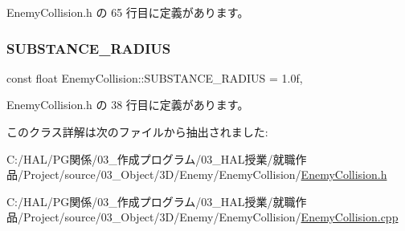  Enemy\+Collision.\+h の 65 行目に定義があります。

\mbox{\label{class_enemy_collision_ab794511516a743fdd9d8f7b00ab6a967}} 
\subsubsection{\texorpdfstring{S\+U\+B\+S\+T\+A\+N\+C\+E\+\_\+\+R\+A\+D\+I\+US}{SUBSTANCE\_RADIUS}}
{\footnotesize\ttfamily const float Enemy\+Collision\+::\+S\+U\+B\+S\+T\+A\+N\+C\+E\+\_\+\+R\+A\+D\+I\+US = 1.\+0f\hspace{0.3cm}{\ttfamily [static]}, {\ttfamily [private]}}



 Enemy\+Collision.\+h の 38 行目に定義があります。



このクラス詳解は次のファイルから抽出されました\+:\begin{DoxyCompactItemize}
\item 
C\+:/\+H\+A\+L/\+P\+G関係/03\+\_\+作成プログラム/03\+\_\+\+H\+A\+L授業/就職作品/\+Project/source/03\+\_\+\+Object/3\+D/\+Enemy/\+Enemy\+Collision/\mbox{\hyperlink{_enemy_collision_8h}{Enemy\+Collision.\+h}}\item 
C\+:/\+H\+A\+L/\+P\+G関係/03\+\_\+作成プログラム/03\+\_\+\+H\+A\+L授業/就職作品/\+Project/source/03\+\_\+\+Object/3\+D/\+Enemy/\+Enemy\+Collision/\mbox{\hyperlink{_enemy_collision_8cpp}{Enemy\+Collision.\+cpp}}\end{DoxyCompactItemize}
